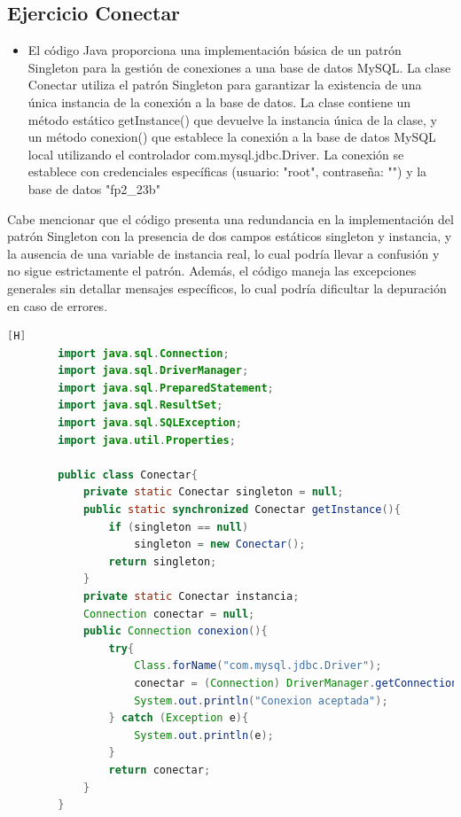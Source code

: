 \documentclass{article}
\begin{document}
	\subsection{Ejercicio Conectar}
	\begin{itemize}	
		\item El código Java proporciona una implementación básica de un patrón Singleton para la gestión de conexiones a una base de datos MySQL. La clase Conectar utiliza el patrón Singleton para garantizar la existencia de una única instancia de la conexión a la base de datos. La clase contiene un método estático getInstance() que devuelve la instancia única de la clase, y un método conexion() que establece la conexión a la base de datos MySQL local utilizando el controlador com.mysql.jdbc.Driver. La conexión se establece con credenciales específicas (usuario: "root", contraseña: "") y la base de datos "fp2_23b"
	\end{itemize}		
		\item Cabe mencionar que el código presenta una redundancia en la implementación del patrón Singleton con la presencia de dos campos estáticos singleton y instancia, y la ausencia de una variable de instancia real, lo cual podría llevar a confusión y no sigue estrictamente el patrón. Además, el código maneja las excepciones generales sin detallar mensajes específicos, lo cual podría dificultar la depuración en caso de errores.
	\begin{lstlisting}[language=java,caption={Las lineas de codigos del metodo creado:}][H]
		import java.sql.Connection;
		import java.sql.DriverManager;
		import java.sql.PreparedStatement;
		import java.sql.ResultSet;
		import java.sql.SQLException;
		import java.util.Properties;
		
		public class Conectar{
			private static Conectar singleton = null;
			public static synchronized Conectar getInstance(){
				if (singleton == null)
					singleton = new Conectar();
				return singleton;
			}
			private static Conectar instancia;
			Connection conectar = null;
			public Connection conexion(){
				try{
					Class.forName("com.mysql.jdbc.Driver");
					conectar = (Connection) DriverManager.getConnection("jdbc:mysql://localhost:3306/fp2_23b","root","");
					System.out.println("Conexion aceptada");
				} catch (Exception e){
					System.out.println(e);
				}
				return conectar;
			}
		}
	\end{lstlisting}
\end{document}
